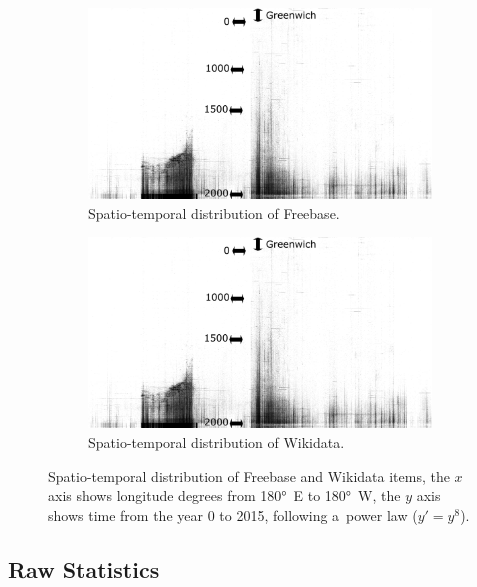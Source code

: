 \documentclass{acm_proc_article-sp}
\begin{document}
\begin{figure}[!htbp]
    \centering
    \begin{subfigure}[b]{1.0\columnwidth}
        \includegraphics[width=\textwidth]{img/freebase-projection-bw.pdf}
        \caption{Spatio-temporal distribution of Freebase.}
        \label{fig:freebase}
    \end{subfigure}
    \begin{subfigure}[b]{1.0\columnwidth}
        \includegraphics[width=\textwidth]{img/freebase-projection-bw.pdf}
        \caption{Spatio-temporal distribution of Wikidata.}
        \label{fig:wikidata}
    \end{subfigure}
    \caption{Spatio-temporal distribution of Freebase and Wikidata items,
      the $x$ axis shows longitude degrees from 180°~E to 180°~W, the $y$ axis shows time
      from the year 0 to 2015, following a~power law ($y' = y^8$).}
    \label{fig:time-space}
\end{figure}

\subsection{Raw Statistics}
\end{document}
